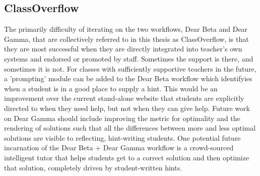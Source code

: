 \subsection{ClassOverflow}

The primarily difficulty of iterating on the two workflows, Dear Beta and Dear Gamma, that are collectively referred to in this thesis as ClassOverflow, is that they are most successful when they are directly integrated into teacher's own systems and endorsed or promoted by staff. Sometimes the support is there, and sometimes it is not. For classes with sufficiently supportive teachers in the future, a 'prompting' module can be added to the Dear Beta workflow which identifyies when a student is in a good place to supply a hint. This would be an improvement over the current stand-alone website that students are explicitly directed to when they need help, but not when they can give help. Future work on Dear Gamma should include improving the metric for optimality and the rendering of solutions such that all the differences between more and less optimal solutions are visible to reflecting, hint-writing students. One potential future incarnation of the Dear Beta + Dear Gamma workflow is a crowd-sourced intelligent tutor that helps students get to a correct solution and then optimize that solution, completely driven by student-written hints. %









